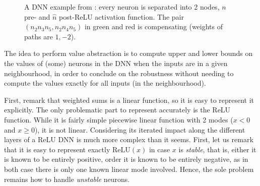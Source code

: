 \documentclass{llncs}
\newcommand{\ReLU}{\mathrm{ReLU}}
\begin{document}
\begin{figure}[t!]
		\caption{A DNN example from \cite{kpoly}: every neuron is separated into 2 nodes, $n$ pre- and $\hat{n}$ post-ReLU activation function. The pair $(n_2 n_3 n_5,n_2 n_4 n_5)$ in green and red is compensating (weights of paths are $1,-2$).}
		\label{fig1}
	\end{figure}
	
The idea to perform value abstraction is to compute upper and lower bounds on the values of (some) neurons in the DNN when the inputs are in a given neighbourhood, in order to conclude on the robustness without needing to compute the values exactly for all inputs (in the neighbourhood).

First, remark that weighted sums is a linear function, so it is easy to represent it explicitly. The only problematic part to represent accurately is the ReLU function. While it is fairly simple piecewise linear function with 2 modes ($x<0$ and $x \geq 0$), it is not linear. Considering its iterated impact along the different layers of a ReLU DNN is much more complex than it seems. First, let us remark that it is easy to represent exactly $\ReLU(x)$ in case $x$ is {\em stable}, that is, either it is known to be entirely positive, order
it is known to be entirely negative, as in both case there is only one known linear mode involved. Hence, the sole problem remains how to handle {\em unstable} neurons.
\end{document}
